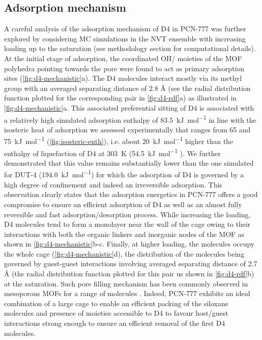 \subsection{Adsorption mechanism}\label{adsorption-mechanism}

A careful analysis of the adsorption mechanism of D4 in PCN-777 was further
explored by considering MC simulations in the NVT ensemble with increasing
loading up to the saturation (see methodology section for computational
details). At the initial stage of adsorption, the coordinated OH/
moieties of the MOF  polyhedra pointing towards the pore were found to
act as primary adsorption sites (\cref{fig:d4-mechanistic}a). The D4 molecules
interact mostly via its methyl group with an averaged separating
 distance of 2.8 Å (see the radial distribution function
plotted for the corresponding pair in \cref{fig:d4-rdf}a) as illustrated in
\cref{fig:d4-mechanistic}a. This associated preferential sitting of D4 is
associated with a relatively high simulated adsorption enthalpy of
\SI{83.5}{\kilo\joule\per\mol} in line with the isosteric heat of adsorption we
assessed experimentally that ranges from 65 and \SI{75}{\kilo\joule\per\mol}
(\cref{fig:isosteric-enth}), i.e. about \SI{20}{\kilo\joule\per\mol} higher than
the enthalpy of liquefaction of D4 at \SI{303}{\kelvin}
(\SI{54.5}{\kilo\joule\per\mol} \citep{lemmonNISTStandardReference2018}). We
further demonstrated that this value remains substantially lower than the one
simulated for DUT-4 (\SI{194.0}{\kilo\joule\per\mol}) for which the adsorption
of D4 is governed by a high degree of confinement and indeed an irreversible
adsorption. This observation clearly states that the adsorption energetics in
PCN-777 offers a good compromise to ensure an efficient adsorption of D4 as well
as an almost fully reversible and fast adsorption/desorption process. While
increasing the loading, D4 molecules tend to form a monolayer near the wall of
the cage owing to their interactions with both the organic linkers and inorganic
nodes of the MOF as shown in \cref{fig:d4-mechanistic}b-c. Finally, at higher
loading, the molecules occupy the whole cage (\cref{fig:d4-mechanistic}d), the
distribution of the molecules being governed by guest-guest interactions
involving averaged separating  distance of 2.7 Å (the radial
distribution function plotted for this pair us shown in \cref{fig:d4-rdf}b) at
the saturation. Such pore filling mechanism has been commonly observed in
mesoporous MOFs for a range of molecules
\citep{zhengMolecularInsightFluorocarbon2020}. Indeed, PCN-777 exhibits an ideal
combination of a large cage to enable an efficient packing of the siloxane
molecules and presence of moieties accessible to D4 to favour host/guest
interactions strong enough to ensure an efficient removal of the first D4
molecules.

